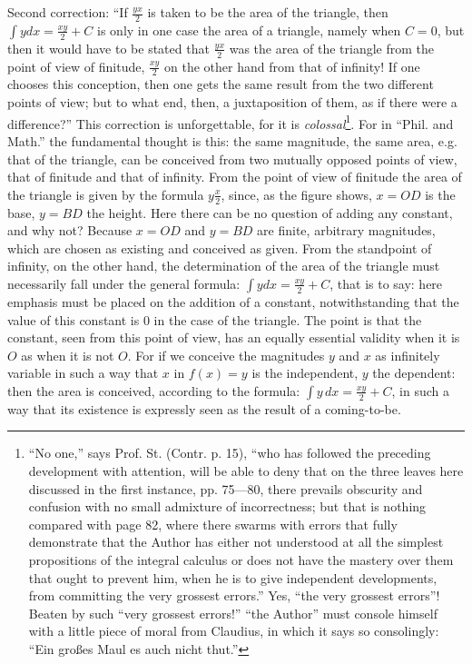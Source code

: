 \documentclass[12pt,a4paper,openany]{book}
\newcommand{\opage}[1]{\marginnote{\footnotesize\textit{[#1]}}}
\begin{document}
Second correction: ``If $\frac{yx}{2}$ is taken to be the area of the triangle, then $\int y dx = \frac{xy}{2} + C$ is only in one case
the area of a triangle, namely when $C = 0$, but then it would
\opage{33}\setcounter{footnote}{0}%
have to be stated that $\frac{yx}{2}$ was the area of the triangle
from the point of view of finitude, $\frac{xy}{2}$ on the other hand from that of
infinity! If one chooses this conception, then one
gets the same result from the two different
points of view; but to what end, then, a juxtaposition of them,
as if there were a difference?'' This correction is unforgettable, for it is \textit{colossal}\footnote{``No one,'' says Prof. St. (Contr. p. 15), ``who has followed the
preceding development with attention, will be able to deny that
on the three leaves here discussed in the first instance, pp. 75---80, there prevails
obscurity and confusion with no small admixture of incorrectness; but that is nothing compared with page 82, where there swarms with errors
that fully demonstrate that the Author has either not understood at all
the simplest propositions of the integral calculus or does not have the mastery over them that ought to prevent him, when he is to give
independent developments, from committing the very grossest errors.'' Yes, ``the
very grossest errors''! Beaten by such ``very grossest errors!'' ``the Author'' must
console himself with a little piece of moral from Claudius, in which it says so
consolingly: ``Ein großes Maul es auch nicht thut.''}. For in ``Phil. and Math.''
the fundamental thought is this: the same magnitude, the
same area, e.g. that of the triangle, can be conceived from two
mutually opposed points of view, that of finitude and that of infinity. From the point of view of finitude the area of the triangle is
given by the formula $y\frac{x}{2}$, since, as the figure shows, $x = OD$
is the base, $y = BD$ the height. Here there can be no question
of adding any constant, and why not? Because
$x = OD$ and $y = BD$ are finite, arbitrary magnitudes, which are
chosen as existing and conceived as given. From the standpoint of infinity, on the other hand, the determination of the area of the triangle must necessarily fall under the general
formula: $\int y dx = \frac{xy}{2} + C$, that is to say: here emphasis must be placed
on the addition of a constant, notwithstanding that the value of
this constant is $0$ in the case of the triangle. The point
\opage{34}\setcounter{footnote}{0}%
is that the constant, seen from this point of view, has an equally %
essential validity when it is $O$ as when it is not
$O$. For if we conceive the magnitudes $y$ and $x$ as infinitely
variable in such a way that $x$ in $f(x) = y$ is the independent, $y$
the dependent: then the area is conceived, according to the formula:
$\int y\,dx = \frac{xy}{2} + C$, in such a way that its existence is expressly
seen as the result of a coming-to-be.
\end{document}
